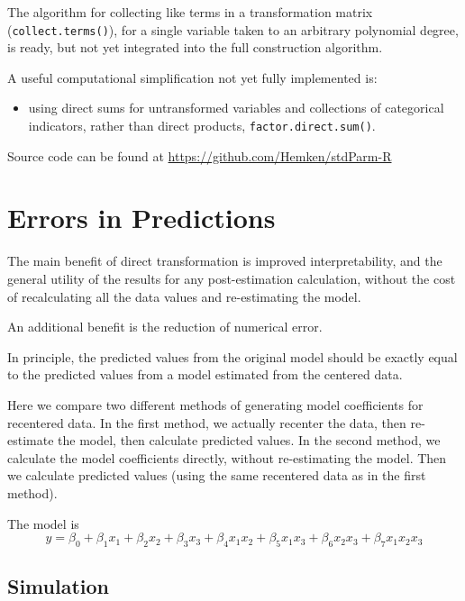\documentclass[]{article}
\providecommand{\tightlist}{%
  \setlength{\itemsep}{0pt}\setlength{\parskip}{0pt}}
\begin{document}
The algorithm for collecting like terms in a transformation matrix
(\texttt{collect.terms()}), for a single variable taken to an arbitrary
polynomial degree, is ready, but not yet integrated into the full
construction algorithm.

A useful computational simplification not yet fully implemented is:

\begin{itemize}
\tightlist
\item
  using direct sums for untransformed variables and collections of
  categorical indicators, rather than direct products,
  \texttt{factor.direct.sum()}.
\end{itemize}

Source code can be found at \url{https://github.com/Hemken/stdParm-R}

\hypertarget{errors-in-predictions}{%
\section{Errors in Predictions}\label{errors-in-predictions}}

The main benefit of direct transformation is improved interpretability,
and the general utility of the results for any post-estimation
calculation, without the cost of recalculating all the data values and
re-estimating the model.

An additional benefit is the reduction of numerical error.

In principle, the predicted values from the original model should be
exactly equal to the predicted values from a model estimated from the
centered data.

Here we compare two different methods of generating model coefficients
for recentered data. In the first method, we actually recenter the data,
then re-estimate the model, then calculate predicted values. In the
second method, we calculate the model coefficients directly, without
re-estimating the model. Then we calculate predicted values (using the
same recentered data as in the first method).

The model is
\[ y = \beta_0 + \beta_1x_1 +\beta_2x_2 + \beta_3x_3 + \beta_4x_1x_2 + 
\beta_5x_1x_3 + \beta_6x_2x_3 + \beta_7x_1x_2x_3\]

\hypertarget{simulation}{%
\subsection{Simulation}\label{simulation}}
\end{document}

